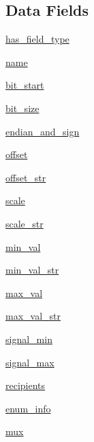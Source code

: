 \subsection*{Data Fields}
\begin{DoxyCompactItemize}
\item 
\hyperlink{classdbc__parse_1_1Signal_a482745cca7b1df11d272f7546197d1f8}{has\+\_\+field\+\_\+type}
\item 
\hyperlink{classdbc__parse_1_1Signal_ab538298f120c1436a0395cefdd7c91c0}{name}
\item 
\hyperlink{classdbc__parse_1_1Signal_a70babd17847e0a22db23a285c7b7bdd4}{bit\+\_\+start}
\item 
\hyperlink{classdbc__parse_1_1Signal_a4ba14a3a4587f26f7f8d039865ced44d}{bit\+\_\+size}
\item 
\hyperlink{classdbc__parse_1_1Signal_a75d62e0bbc10f9682109ec1defebd5ee}{endian\+\_\+and\+\_\+sign}
\item 
\hyperlink{classdbc__parse_1_1Signal_af698c461bf08c328b95087f7dec8ca4a}{offset}
\item 
\hyperlink{classdbc__parse_1_1Signal_aac59c3d1de5ad348e2b8e3b6fd31da5e}{offset\+\_\+str}
\item 
\hyperlink{classdbc__parse_1_1Signal_aff0d2616f41078194641bce53785f2cb}{scale}
\item 
\hyperlink{classdbc__parse_1_1Signal_a39ba9bac6b2f60376c169b299e20b017}{scale\+\_\+str}
\item 
\hyperlink{classdbc__parse_1_1Signal_a487fdfe59aaa5c9e835d84f7e91901d9}{min\+\_\+val}
\item 
\hyperlink{classdbc__parse_1_1Signal_ab7864f77d3e26a0447de441b0980ac16}{min\+\_\+val\+\_\+str}
\item 
\hyperlink{classdbc__parse_1_1Signal_a473c01c5af2e2c600d3d17d8cb06a64b}{max\+\_\+val}
\item 
\hyperlink{classdbc__parse_1_1Signal_afd5847e1ea74473e11d985a906a30c9c}{max\+\_\+val\+\_\+str}
\item 
\hyperlink{classdbc__parse_1_1Signal_a87563549f85b5c452c52c18d2475dc0f}{signal\+\_\+min}
\item 
\hyperlink{classdbc__parse_1_1Signal_a82b53a33dbba539f6ad99e9f17c8f87b}{signal\+\_\+max}
\item 
\hyperlink{classdbc__parse_1_1Signal_ad200d8c7d21a2943c55a5b616443fced}{recipients}
\item 
\hyperlink{classdbc__parse_1_1Signal_aac97d1e459137a01a0d8a3009f8fde03}{enum\+\_\+info}
\item 
\hyperlink{classdbc__parse_1_1Signal_a8f61273cc5f0f6403fc060755bb673f8}{mux}
\end{DoxyCompactItemize}


